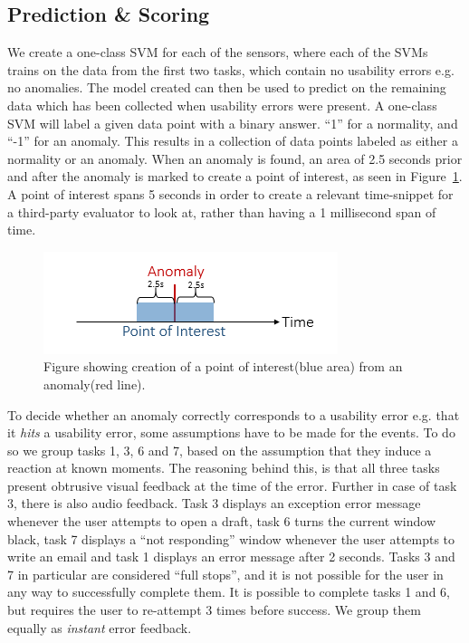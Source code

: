 \subsection{Prediction \& Scoring}
We create a one-class SVM for each of the sensors, where each of the SVMs trains on the data from the first two tasks, which contain no usability errors e.g. no anomalies. The model created can then be used to predict on the remaining data which has been collected when usability errors were present.
A one-class SVM will label a given data point with a binary answer. ``1'' for a normality, and ``-1'' for an anomaly.
This results in a collection of data points labeled as either a normality or an anomaly.
When an anomaly is found, an area of 2.5 seconds prior and after the anomaly is marked to create a point of interest, as seen in Figure~\ref{[FIGURE] anomaly}. 
A point of interest spans 5 seconds in order to create a relevant time-snippet for a third-party evaluator to look at, rather than having a 1 millisecond span of time.
\begin{figure}
    \centering
  \includegraphics[width=0.75\columnwidth]{graphics/anomaly.png}
    \caption{Figure showing creation of a point of interest(blue area) from an anomaly(red line).}
    \label{[FIGURE] anomaly}
\end{figure}
To decide whether an anomaly correctly corresponds to a usability error e.g. that it \textit{hits} a usability error, some assumptions have to be made for the events.
To do so we group tasks 1, 3, 6 and 7, based on the assumption that they induce a reaction at known moments. The reasoning behind this, is that all three tasks present obtrusive visual feedback at the time of the error. Further in case of task 3, there is also audio
feedback. Task 3 displays an exception error message whenever the user attempts to open a draft, task 6 turns the
current window
black, task 7 displays a ``not responding'' window whenever the user attempts to write an email and task 1 displays an
error message after 2 seconds. Tasks 3 and 7 in particular are considered ``full stops'', and it is not possible for the
user in any way to successfully complete them. It is possible to complete tasks 1 and 6, but requires the user to
re-attempt 3 times before success. We group them equally as \textit{instant} error feedback.

